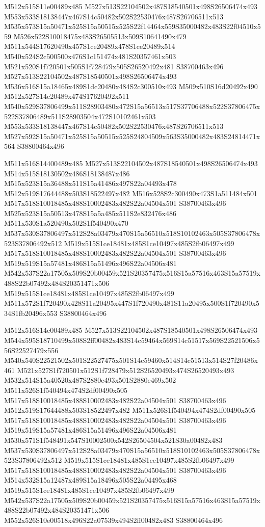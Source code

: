 \documentclass{article}
\begin{document}
\begin{multicols}{2}
M512x515S11e00489x485 M527x513S22104502x487S18540501x498S26506474x493 M553x533S18138447x467S14c50482x502S22530476x487S26706511x513 M535x573S15a50471x525S15a50515x525S22f14464x559S35000482x483S22f04510x559 M526x522S10018475x483S26505513x509S10641490x479 M511x544S17620490x457S1ce20489x478S1ce20489x514 M540x524S2c500500x476S1c151474x481S20357461x503 M521x520S1f720501x505S1f728479x505S26520492x481 S38700463x496 M527x513S22104502x487S18540501x498S26506474x493 M536x516S15a18465x489S1dc20480x484S2c300510x493 M509x510S16d20492x490 M512x527S14c20489x474S17620492x511 M540x529S37806499x511S28903480x472S15a56513x517S37706488x522S37806475x522S37806489x511S28903504x472S10102461x503 M553x533S18138447x467S14c50482x502S22530476x487S26706511x513 M527x592S15a50471x525S15a50515x525S24804509x563S35000482x483S24814471x564 S38800464x496

M511x516S14400489x485 M527x513S22104502x487S18540501x498S26506474x493 M514x515S18130502x486S18138487x486 M515x523S15a36488x511S15a41486x497S22a04493x478 M512x519S17644488x503S18522497x482 M516x528S2c300490x473S1a511484x501 M517x518S10018485x488S10002483x482S22a04504x501 S38700463x496 M525x523S15a50513x478S15a5a485x511S2e832476x486 M511x530S1a520490x502S1f540490x470 M537x530S37806497x512S28a03479x470S15a56510x518S10102463x505S37806478x523S37806492x512 M519x515S1ce18481x485S1ce10497x485S2fb06497x499 M517x518S10018485x488S10002483x482S22a04504x501 S38700463x496 M519x519S15a57481x486S15a51496x496S22a04506x481 M542x537S22a17505x509S20b00459x521S20357475x516S15a57516x463S15a57519x488S22b07492x484S20351471x506 M519x515S1ce18481x485S1ce10497x485S2fb06497x499 M511x572S1f720490x428S11a20495x447S1f720490x481S11a20495x500S1f720490x534S1fb20496x553 S38800464x496

M512x516S14c00489x485 M527x513S22104502x487S18540501x498S26506474x493 M544x595S18710499x508S2ff00482x483S14c59464x569S14c51517x569S22521506x556S22527479x556 M540x540S22521502x501S22527475x501S14c59460x514S14c51513x514S27f20486x461 M521x527S1f720501x512S1f728479x512S26520493x474S26520493x493 M532x514S15a40520x487S2880e493x501S2880e469x502 M511x526S1f540494x474S2df00490x505 M517x518S10018485x488S10002483x482S22a04504x501 S38700463x496 M512x519S17644488x503S18522497x482 M511x526S1f540494x474S2df00490x505 M517x518S10018485x488S10002483x482S22a04504x501 S38700463x496 M519x519S15a57481x486S15a51496x496S22a04506x481 M530x571S1f548491x547S10002500x542S26504504x521S30a00482x483 M537x530S37806497x512S28a03479x470S15a56510x518S10102463x505S37806478x523S37806492x512 M519x515S1ce18481x485S1ce10497x485S2fb06497x499 M517x518S10018485x488S10002483x482S22a04504x501 S38700463x496 M514x532S15a12487x489S15a18496x505S22a04495x468 M519x515S1ce18481x485S1ce10497x485S2fb06497x499 M542x537S22a17505x509S20b00459x521S20357475x516S15a57516x463S15a57519x488S22b07492x484S20351471x506 M552x526S10e00518x496S22a07539x494S2ff00482x483 S38800464x496


\end{multicols}
\end{document}
